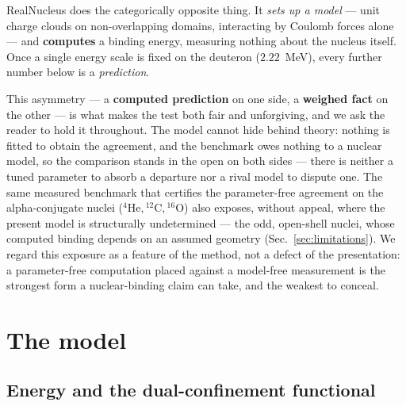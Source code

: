 \documentclass[11pt]{article}
\begin{document}
RealNucleus does the categorically opposite thing. It \emph{sets up a model} --- unit charge
clouds on non-overlapping domains, interacting by Coulomb forces alone --- and \textbf{computes}
a binding energy, measuring nothing about the nucleus itself. Once a single energy scale is fixed
on the deuteron ($2.22$~MeV), every further number below is a \emph{prediction}.

This asymmetry --- a \textbf{computed prediction} on one side, a \textbf{weighed fact} on the
other --- is what makes the test both fair and unforgiving, and we ask the reader to hold it
throughout. The model cannot hide behind theory: nothing is fitted to obtain the agreement, and the
benchmark owes nothing to a nuclear model, so the comparison stands in the open on both sides ---
there is neither a tuned parameter to absorb a departure nor a rival model to dispute one. The same
measured benchmark that certifies the parameter-free agreement
on the alpha-conjugate nuclei ($^4\mathrm{He},{}^{12}\mathrm{C},{}^{16}\mathrm{O}$) also exposes,
without appeal, where the present model is structurally undetermined --- the odd, open-shell
nuclei, whose computed binding depends on an assumed geometry (Sec.~\ref{sec:limitations}). We
regard this exposure as a feature of the method, not a defect of the presentation: a
parameter-free computation placed against a model-free measurement is the strongest form a
nuclear-binding claim can take, and the weakest to conceal.

\section{The model}

\subsection{Energy and the dual-confinement functional}
\end{document}
